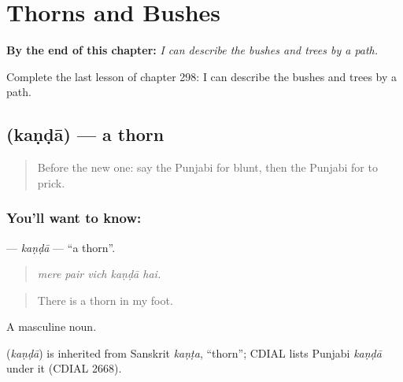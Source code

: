 
\chapter{Thorns and Bushes}
\label{ch:pa-a2-thorns-and-bushes}

\begin{chapteropening}
\textbf{By the end of this chapter:} \emph{I can describe the bushes and trees by a path.}

Complete the last lesson of chapter 298: I can describe the bushes and trees by a path.
\end{chapteropening}

\section[\texorpdfstring{\pa{ਕੰਡਾ} (kaṇḍā)}{ਕੰਡਾ (kaṇḍā)}]{ (kaṇḍā) — a thorn}

\label{lesson:PA-C298-kanda}



\begin{quote}
Before the new one: say the Punjabi for blunt, then the Punjabi for to prick.
\end{quote}

\subsection*{You'll want to know: }
\textbf{} — \emph{kaṇḍā} — \textquotedblleft{}a thorn\textquotedblright{}.

\begin{quote}
    
\end{quote}

\begin{quote}
\emph{mere pair vich kaṇḍā hai.}
\end{quote}

\begin{quote}
There is a thorn in my foot.
\end{quote}

A masculine noun.

\begin{cousinweb}
\textbf{} (\emph{kaṇḍā}) is inherited from Sanskrit \emph{kaṇṭa}, \textquotedblleft{}thorn\textquotedblright{}; CDIAL lists Punjabi \emph{kaṇḍā} under it (CDIAL 2668).
\end{cousinweb}

